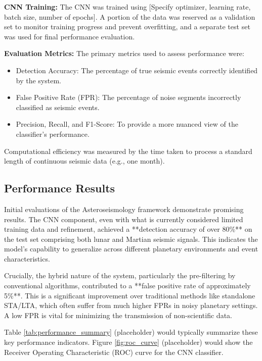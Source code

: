 \documentclass[conference]{IEEEtran}
\begin{document}
\textbf{CNN Training:} The CNN was trained using [Specify optimizer, learning rate, batch size, number of epochs]. A portion of the data was reserved as a validation set to monitor training progress and prevent overfitting, and a separate test set was used for final performance evaluation.

\textbf{Evaluation Metrics:} The primary metrics used to assess performance were:
\begin{itemize}
    \item Detection Accuracy: The percentage of true seismic events correctly identified by the system.
    \item False Positive Rate (FPR): The percentage of noise segments incorrectly classified as seismic events.
    \item Precision, Recall, and F1-Score: To provide a more nuanced view of the classifier's performance.
\end{itemize}
Computational efficiency was measured by the time taken to process a standard length of continuous seismic data (e.g., one month).

\subsection{Performance Results}
Initial evaluations of the Asteroseismology framework demonstrate promising results. The CNN component, even with what is currently considered limited training data and refinement, achieved a **detection accuracy of over 80\%** on the test set comprising both lunar and Martian seismic signals. This indicates the model's capability to generalize across different planetary environments and event characteristics.

Crucially, the hybrid nature of the system, particularly the pre-filtering by conventional algorithms, contributed to a **false positive rate of approximately 5\%**. This is a significant improvement over traditional methods like standalone STA/LTA, which often suffer from much higher FPRs in noisy planetary settings. A low FPR is vital for minimizing the transmission of non-scientific data.

Table \ref{tab:performance_summary} (placeholder) would typically summarize these key performance indicators. Figure \ref{fig:roc_curve} (placeholder) would show the Receiver Operating Characteristic (ROC) curve for the CNN classifier.
\end{document}
